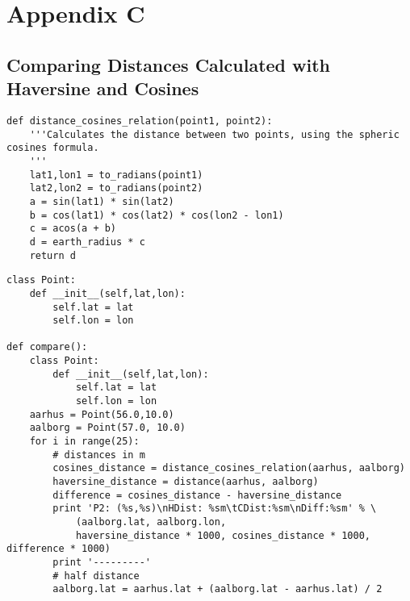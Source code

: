 \chapter{Appendix C}
\label{AppendixHaversine}

\section{Comparing Distances Calculated with Haversine and Cosines}

\begin{lstlisting}
def distance_cosines_relation(point1, point2):
    '''Calculates the distance between two points, using the spheric cosines formula.
    '''
    lat1,lon1 = to_radians(point1)
    lat2,lon2 = to_radians(point2)
    a = sin(lat1) * sin(lat2)
    b = cos(lat1) * cos(lat2) * cos(lon2 - lon1)
    c = acos(a + b)
    d = earth_radius * c
    return d  
\end{lstlisting}

\begin{lstlisting}
class Point:
    def __init__(self,lat,lon):
        self.lat = lat
        self.lon = lon

def compare():
    class Point:
        def __init__(self,lat,lon):
            self.lat = lat
            self.lon = lon
    aarhus = Point(56.0,10.0)
    aalborg = Point(57.0, 10.0)
    for i in range(25):
        # distances in m
        cosines_distance = distance_cosines_relation(aarhus, aalborg)
        haversine_distance = distance(aarhus, aalborg)
        difference = cosines_distance - haversine_distance
        print 'P2: (%s,%s)\nHDist: %sm\tCDist:%sm\nDiff:%sm' % \
            (aalborg.lat, aalborg.lon, 
            haversine_distance * 1000, cosines_distance * 1000, difference * 1000)
        print '---------'
        # half distance
        aalborg.lat = aarhus.lat + (aalborg.lat - aarhus.lat) / 2      
\end{lstlisting}

